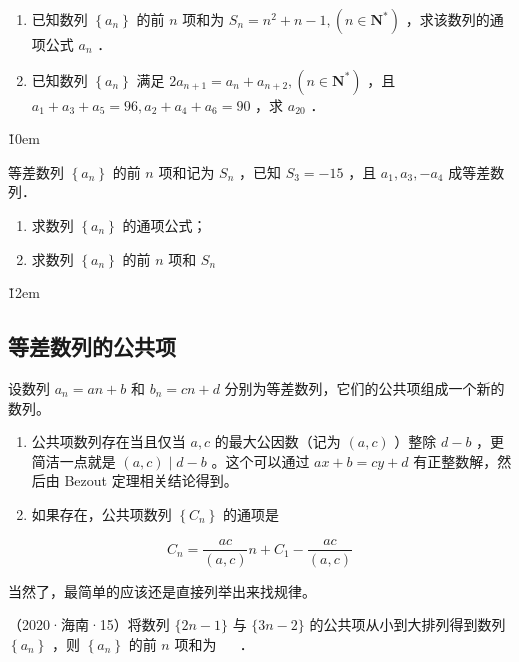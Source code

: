 \begin{example}
    \begin{enumerate}
        \item 已知数列 $\left\{a_n\right\}$ 的前 $n$ 项和为 $S_n=n^2+n-1,\left(n \in \mathbf{N}^*\right)$ ，求该数列的通项公式 $a_n$ ．
        \item 已知数列 $\left\{a_n\right\}$ 满足 $2 a_{n+1}=a_n+a_{n+2},\left(n \in \mathbf{N}^*\right)$ ，且 $a_1+a_3+a_5=96, a_2+a_4+a_6=90$ ，求 $a_{20}$ ．
    \end{enumerate}
\end{example}

\v{10em}

\begin{example}
    等差数列 $\left\{a_n\right\}$ 的前 $n$ 项和记为 $S_n$ ，已知 $S_3=-15$ ，且 $a_1, a_3,-a_4$ 成等差数列．
    \begin{enumerate}
        \item 求数列 $\left\{a_n\right\}$ 的通项公式；
        \item 求数列 $\left\{a_n\right\}$ 的前 $n$ 项和 $S_n$
    \end{enumerate}
\end{example}

\v{12em}

\subsection{等差数列的公共项}

\begin{theorem}[等差数列的公共项]
    设数列 $a_n=an+b$ 和 $b_n=cn+d$ 分别为等差数列，它们的公共项组成一个新的数列。
    \begin{enumerate}
        \item 公共项数列存在当且仅当 $a, c$ 的最大公因数（记为 $(a, c)$ ）整除 $d-b$ ，更简洁一点就是 $(a, c) \mid d-b$ 。这个可以通过 $a x+b=c y+d$ 有正整数解，然后由 Bezout 定理相关结论得到。
        \item 如果存在，公共项数列 $\left\{C_n\right\}$ 的通项是
    \end{enumerate}
    $$
        C_n=\frac{a c}{(a, c)} n+C_1-\frac{a c}{(a, c)}
    $$
\end{theorem}

\begin{tips}
    当然了，最简单的应该还是直接列举出来找规律。
\end{tips}

\begin{example}
    （2020·海南·15）将数列 $\{2 n-1\}$ 与 $\{3 n-2\}$ 的公共项从小到大排列得到数列 $\left\{a_n\right\}$ ，则 $\left\{a_n\right\}$ 的前 $n$ 项和为 \underline{$\quad$} ．
\end{example}

